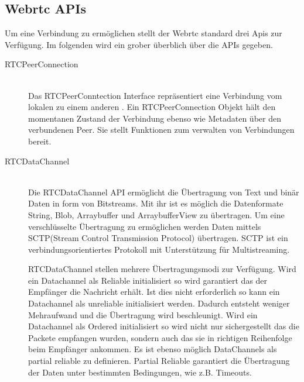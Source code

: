 \subsection{Webrtc APIs}
Um eine \pTp Verbindung zu ermöglichen stellt der Webrtc standard drei Apis zur Verfügung. Im folgenden wird ein grober überblich über die APIs gegeben.
\begin{description}
\item[RTCPeerConnection]\hfill \\
Das RTCPeerConntection Interface repräsentiert eine Verbindung vom lokalen \client zu einem anderen \client. Ein RTCPeerConnection Objekt hält den momentanen Zustand der Verbindung ebenso wie Metadaten über den verbundenen Peer. Sie stellt Funktionen zum verwalten von Verbindungen bereit.



\item[RTCDataChannel]\hfill \\
Die RTCDataChannel API ermöglicht die Übertragung von Text und binär Daten in form von Bitstreams. Mit ihr ist es möglich die Datenformate String, Blob, Arraybuffer und ArraybufferView zu übertragen.\cite{rfc-datachannel} Um eine verschlüsselte Übertragung zu ermöglichen werden Daten mittels SCTP(Stream Control Transmission Protocol) übertragen. SCTP ist ein verbindungsorientiertes Protokoll mit Unterstützung für Multistreaming.\cite{rfc-sctp} 

RTCDataChannel stellen mehrere Übertragungsmodi zur Verfügung. Wird ein Datachannel als Reliable initialisiert so wird garantiert das der Empfänger die Nachricht erhält. Ist dies nicht erforderlich so kann ein Datachannel als unreliable initialisiert werden. Dadurch entsteht weniger Mehraufwand und die Übertragung wird beschleunigt. Wird ein Datachannel als Ordered initialisiert so wird nicht nur sichergestellt das die Packete empfangen wurden, sondern auch das sie in richtigen Reihenfolge beim Empfänger ankommen. Es ist ebenso möglich DataChannels als partial reliable zu definieren. Partial Reliable garantiert die Übertragung der Daten unter bestimmten Bedingungen, wie z.B. Timeouts.




\end{description}
